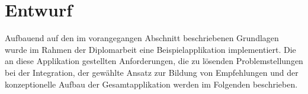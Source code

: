\section{Entwurf}\label{sec:architecture}

Aufbauend auf den im vorangegangen Abschnitt beschriebenen Grundlagen wurde im Rahmen der Diplomarbeit eine Beispielapplikation implementiert. Die an diese Applikation gestellten Anforderungen, die zu lösenden Problemstellungen bei der Integration, der gewählte Ansatz zur Bildung von Empfehlungen und der konzeptionelle Aufbau der Gesamtapplikation werden im Folgenden beschrieben.







